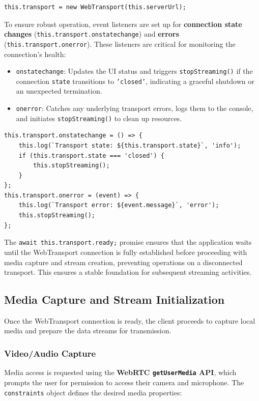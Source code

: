 \begin{lstlisting}[breaklines=true,basicstyle=\small\ttfamily,frame=single]
this.transport = new WebTransport(this.serverUrl);
\end{lstlisting}

To ensure robust operation, event listeners are set up for \textbf{connection state changes} (\texttt{this.transport.onstatechange}) and \textbf{errors} (\texttt{this.transport.onerror}). These listeners are critical for monitoring the connection's health:

\begin{itemize}
    \item \texttt{onstatechange}: Updates the UI status and triggers \texttt{stopStreaming()} if the connection \texttt{state} transitions to \texttt{'closed'}, indicating a graceful shutdown or an unexpected termination.
    \item \texttt{onerror}: Catches any underlying transport errors, logs them to the console, and initiates \texttt{stopStreaming()} to clean up resources.
\end{itemize}

\begin{lstlisting}[breaklines=true,basicstyle=\small\ttfamily,frame=single]
this.transport.onstatechange = () => {
    this.log(`Transport state: ${this.transport.state}`, 'info');
    if (this.transport.state === 'closed') {
        this.stopStreaming();
    }
};
this.transport.onerror = (event) => {
    this.log(`Transport error: ${event.message}`, 'error');
    this.stopStreaming();
};
\end{lstlisting}

The \texttt{await this.transport.ready;} promise ensures that the application waits until the WebTransport connection is fully established before proceeding with media capture and stream creation, preventing operations on a disconnected transport. This ensures a stable foundation for subsequent streaming activities.

\subsection{Media Capture and Stream Initialization}
Once the WebTransport connection is ready, the client proceeds to capture local media and prepare the data streams for transmission.

\subsubsection{Video/Audio Capture}
Media access is requested using the \textbf{WebRTC \texttt{getUserMedia} API}, which prompts the user for permission to access their camera and microphone. The \texttt{constraints} object defines the desired media properties:

